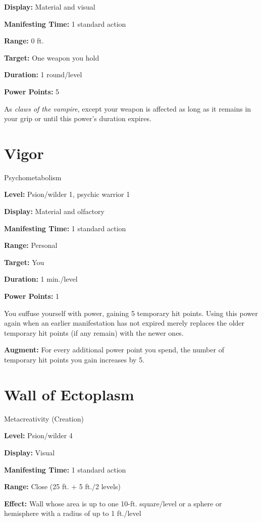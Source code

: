 \documentclass{article}
\begin{document}
\textbf{Display:} Material and visual

\textbf{Manifesting Time:} 1 standard action

\textbf{Range:} 0 ft.

\textbf{Target:} One weapon you hold

\textbf{Duration:} 1 round/level

\textbf{Power Points:} 5

As \textit{claws of the vampire}, except your weapon is affected as long as it 
remains in your grip or until this power's duration expires.

\vspace{12pt}
\section*{Vigor}

Psychometabolism

\textbf{Level:} Psion/wilder 1, psychic warrior 1

\textbf{Display:} Material and olfactory

\textbf{Manifesting Time:} 1 standard action

\textbf{Range:} Personal

\textbf{Target:} You

\textbf{Duration:} 1 min./level

\textbf{Power Points:} 1

You suffuse yourself with power, gaining 5 temporary hit points. Using this power 
again when an earlier manifestation has not expired merely replaces the older temporary 
hit points (if any remain) with the newer ones.

\textbf{Augment:} For every additional power point you spend, the number of temporary 
hit points you gain increases by 5.

\vspace{12pt}
\section*{Wall of Ectoplasm}

Metacreativity (Creation)

\textbf{Level:} Psion/wilder 4

\textbf{Display:} Visual

\textbf{Manifesting Time:} 1 standard action

\textbf{Range:} Close (25 ft. + 5 ft./2 levels)

\textbf{Effect:} Wall whose area is up to one 10-ft. square/level or a sphere or 
hemisphere with a radius of up to 1 ft./level
\end{document}
